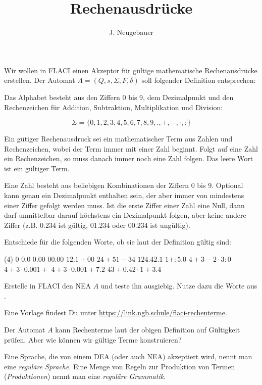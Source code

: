 \documentclass[10pt, a4paper]{scrartcl}
\author{J. Neugebauer}
\title{Rechenausdrücke}
\date{\Heute}
\begin{document}
\ReiheTitel

Wir wollen in FLACI einen Akzeptor für gültige mathematische Rechenausdrücke erstellen. Der Automat $A = (Q, s, \Sigma, F, \delta)$ soll folgender Definition entsprechen:

Das Alphabet besteht aus den Ziffern 0 bis 9, dem Dezimalpunkt und den Rechenzeichen für Addition, Subtraktion, Multiplikation und Division:

\[ \Sigma = \{0,1,2,3,4,5,6,7,8,9,.,+,-,\cdot,:\} \]

Ein gütiger Rechenausdruck sei ein mathematischer Term aus Zahlen und Rechenzeichen, wobei der Term immer mit einer Zahl beginnt. Folgt auf eine Zahl ein Rechenzeichen, so muss danach immer noch eine Zahl folgen. Das leere Wort ist ein gültiger Term.

Eine Zahl besteht aus beliebigen Kombinationen der Ziffern 0 bis 9. Optional kann genau ein Dezimalpunkt enthalten sein, der aber immer von mindestens einer Ziffer gefolgt werden muss. Ist die erste Ziffer einer Zahl eine Null, dann darf unmittelbar darauf höchstens ein Dezimalpunkt folgen, aber keine andere Ziffer (z.B. $0.234$ ist gültig, $01.234$ oder $00.234$ ist ungültig).

\begin{aufgabe}\label{aufg:worte}
	Entschiede für die folgenden Worte, ob sie laut der Definition gültig sind:
	
	\begin{tasks}(4)
		\task $0$
		\task $0.0$
		\task $0.00$
		\task $00.00$
		\task $12.1+00$
		\task $24+51-34$
		\task $124.42.1$
		\task $1+:5.0$
		\task $4+3-2\cdot3:0$
		\task $4+3\cdot0.001+$
		\task $4+3\cdot0.001+7.2$
		\task $43+0.42\cdot1+3.4$
	\end{tasks}
\end{aufgabe}

\begin{aufgabe}
	Erstelle in FLACI den NEA $A$ und teste ihn ausgiebig. Nutze dazu die Worte aus .
	
	Eine Vorlage findest Du unter \url{https://link.ngb.schule/flaci-rechenterme}.
\end{aufgabe}

Der Automat $A$ kann Rechenterme laut der obigen Definition auf Gültigkeit prüfen. Aber wie können wir gültige Terme konstruieren?

Eine Sprache, die von einem DEA (oder auch NEA) akzeptiert wird, nennt man eine \emph{reguläre Sprache}. Eine Menge von Regeln zur Produktion von Termen (\emph{Produktionen}) nennt man eine \emph{reguläre Grammatik}.
\end{document}
